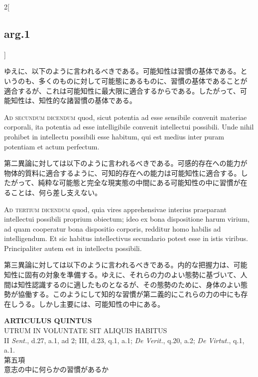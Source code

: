 \documentclass[paper=a4paper,fontsize=10pt,jafontsize=9pt,titlepage]{jlreq}
\begin{document}
\begin{paracol}{2}[\subsection{arg.1}]
\switchcolumn

ゆえに、以下のように言われるべきである。可能知性は習慣の基体である。と
いうのも、多くのものに対して可能態にあるものに、習慣の基体であることが
適合するが、これは可能知性に最大限に適合するからである。したがって、可
能知性は、知性的な諸習慣の基体である。

\switchcolumn*[\subsection{ad.2}]

{\scshape Ad secundum dicendum} quod, sicut potentia ad esse sensibile
convenit materiae corporali, ita potentia ad esse intelligibile
convenit intellectui possibili. Unde nihil prohibet in intellectu
possibili esse habitum, qui est medius inter puram potentiam et actum
perfectum.

\switchcolumn

第二異論に対しては以下のように言われるべきである。可感的存在への能力が
物体的質料に適合するように、可知的存在への能力は可能知性に適合する。し
たがって、純粋な可能態と完全な現実態の中間にある可能知性の中に習慣が在
ることは、何ら差し支えない。

\switchcolumn*[\subsection{ad.3}]

{\scshape Ad tertium dicendum} quod, quia vires apprehensivae interius
praeparant intellectui possibili proprium obiectum; ideo ex bona
dispositione harum virium, ad quam cooperatur bona dispositio
corporis, redditur homo habilis ad intelligendum. Et sic habitus
intellectivus secundario potest esse in istis viribus. Principaliter
autem est in intellectu possibili.

\switchcolumn

第三異論に対しては以下のように言われるべきである。内的な把握力は、可能
知性に固有の対象を準備する。ゆえに、それらの力のよい態勢に基づいて、人
間は知性認識するのに適したものとなるが、その態勢のために、身体のよい態
勢が協働する。このようにして知的な習慣が第二義的にこれらの力の中にも存
在しうる。しかし主要には、可能知性の中にある。

\end{paracol}
\newpage


{}
\setcounter{section}{5}
\setcounter{subsection}{0}
\begin{center}
{\Large {\bfseries ARTICULUS QUINTUS}}\\
{\large UTRUM IN VOLUNTATE SIT ALIQUIS HABITUS}\\
{\footnotesize II {\itshape Sent.}, d.27, a.1, ad 2; III, d.23, q.1, a.1; {\itshape De Verit.}, q.20, a.2; {\itshape De Virtut.}, q.1, a.1.}\\
{\Large 第五項\\意志の中に何らかの習慣があるか}
\end{center}
\end{document}
